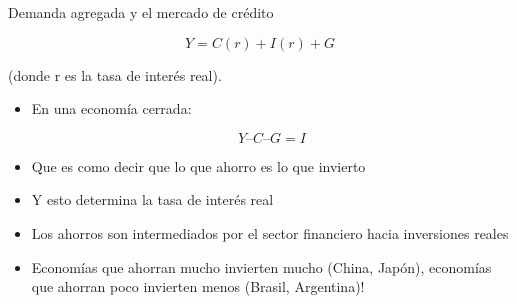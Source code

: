 \documentclass{beamer}
\begin{document}
\begin{frame}{Demanda agregada y el mercado de crédito}

    \begin{itemize}
\begin{tcolorbox}[width=4in,
                  interior hidden,
                  boxsep=0pt,
                  left=0pt,
                  right=0pt,
                  top=2pt,
                  ]%
$$ Y = C(r) + I(r) + G $$
\end{tcolorbox}
    \end{itemize}
    
\centering \small{(donde r es la tasa de interés real)}.

 \begin{itemize}
        \item En una economía cerrada:
        
        \begin{tcolorbox}[width=4in,
                  interior hidden,
                  boxsep=0pt,
                  left=0pt,
                  right=0pt,
                  top=2pt,
                  ]%
                    $$ Y – C – G = I $$
        \end{tcolorbox}
        
    \end{itemize}
    
     \begin{itemize}
        \item Que es como decir que lo que ahorro es lo que invierto
        \item Y esto determina la tasa de interés real
        \item Los ahorros son intermediados por el sector financiero hacia inversiones reales
        \item Economías que ahorran mucho invierten mucho (China, Japón), economías que ahorran poco invierten menos (Brasil, Argentina)! 
    \end{itemize}
 


\end{frame}





\end{document}
